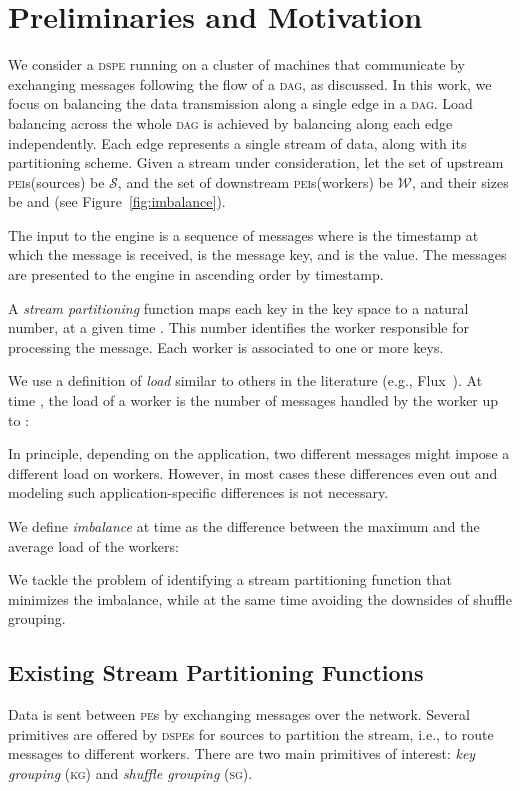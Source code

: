 \documentclass[10pt,conference,letterpaper]{IEEEtran}
\newcommand{\pei}{\textsc{pei}\xspace}
\newcommand{\peis}{{\pei}s\xspace}
\newcommand{\pe}{\textsc{pe}\xspace}
\newcommand{\pes}{{\pe}s\xspace}
\newcommand{\dspe}{\textsc{dspe}\xspace}
\newcommand{\dspes}{{\dspe}s\xspace}
\newcommand{\dagr}{\textsc{dag}\xspace}
\newcommand{\kg}{\textsc{kg}\xspace}
\newcommand{\sg}{\textsc{sg}\xspace}
\newcommand{\sources}{\ensuremath{\mathcal{S}}\xspace}
\newcommand{\workers}{\ensuremath{\mathcal{W}}\xspace}
\begin{document}
 \section{Preliminaries and Motivation}
\label{sec:preliminaries}





We consider a \dspe running on a cluster of machines that communicate by exchanging messages following the flow of a \dagr, as discussed.
In this work, we focus on balancing the data transmission along a single edge in a \dagr.
Load balancing across the whole \dagr is achieved by balancing along each edge independently.
Each edge represents a single stream of data, along with its partitioning scheme.
Given a stream under consideration, let the set of upstream \peis (sources) be \sources, and the set of downstream \peis (workers) be \workers, and their sizes be  and  (see Figure~\ref{fig:imbalance}).


The input to the engine is a sequence of messages  where  is the timestamp at which the message is received,  is the message key, and  is the value.
The messages are presented to the engine in ascending order by timestamp.


A {\em stream partitioning} function  maps each key in the key space to a natural number, at a given time .
This number identifies the worker responsible for processing the message.
Each worker is associated to one or more keys.


We use a definition of \emph{load} similar to others in the literature (e.g., Flux~\citep{shah2003flux}).
At time , the load of a worker  is the number of messages handled by the worker up to :



In principle, depending on the application, two different messages might impose a different load on workers.
However, in most cases these differences even out and modeling such application-specific differences is not necessary.

We define {\em imbalance} at time  as the difference between the maximum and the average load of the workers:


We tackle the problem of identifying a stream partitioning function that minimizes the imbalance,
while at the same time avoiding the downsides of shuffle grouping.






\subsection{Existing Stream Partitioning Functions}
\label{sec:existing-partitioning}
Data is sent between \pes by exchanging messages over the network.
Several primitives are offered by \dspes for sources to partition the stream, i.e., to route messages to different workers.
There are two main primitives of interest: \emph{key grouping} (\kg) and \emph{shuffle grouping} (\sg).
\end{document}
